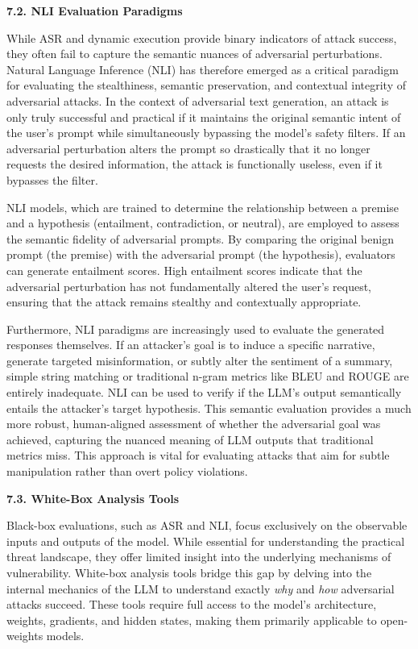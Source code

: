 \documentclass[11pt,a4paper]{article}
\begin{document}
\textbf{7.2. NLI Evaluation Paradigms}

While ASR and dynamic execution provide binary indicators of attack success, they often fail to capture the semantic nuances of adversarial perturbations. Natural Language Inference (NLI) has therefore emerged as a critical paradigm for evaluating the stealthiness, semantic preservation, and contextual integrity of adversarial attacks. In the context of adversarial text generation, an attack is only truly successful and practical if it maintains the original semantic intent of the user's prompt while simultaneously bypassing the model's safety filters. If an adversarial perturbation alters the prompt so drastically that it no longer requests the desired information, the attack is functionally useless, even if it bypasses the filter.

NLI models, which are trained to determine the relationship between a premise and a hypothesis (entailment, contradiction, or neutral), are employed to assess the semantic fidelity of adversarial prompts. By comparing the original benign prompt (the premise) with the adversarial prompt (the hypothesis), evaluators can generate entailment scores. High entailment scores indicate that the adversarial perturbation has not fundamentally altered the user's request, ensuring that the attack remains stealthy and contextually appropriate. 

Furthermore, NLI paradigms are increasingly used to evaluate the generated responses themselves. If an attacker's goal is to induce a specific narrative, generate targeted misinformation, or subtly alter the sentiment of a summary, simple string matching or traditional n-gram metrics like BLEU and ROUGE are entirely inadequate. NLI can be used to verify if the LLM's output semantically entails the attacker's target hypothesis. This semantic evaluation provides a much more robust, human-aligned assessment of whether the adversarial goal was achieved, capturing the nuanced meaning of LLM outputs that traditional metrics miss. This approach is vital for evaluating attacks that aim for subtle manipulation rather than overt policy violations.

\textbf{7.3. White-Box Analysis Tools}

Black-box evaluations, such as ASR and NLI, focus exclusively on the observable inputs and outputs of the model. While essential for understanding the practical threat landscape, they offer limited insight into the underlying mechanisms of vulnerability. White-box analysis tools bridge this gap by delving into the internal mechanics of the LLM to understand exactly \textit{why} and \textit{how} adversarial attacks succeed. These tools require full access to the model's architecture, weights, gradients, and hidden states, making them primarily applicable to open-weights models.
\end{document}

